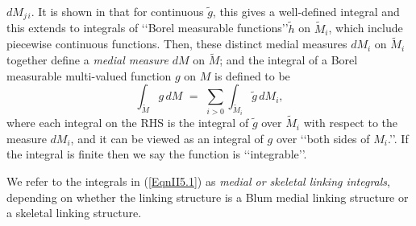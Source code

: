 \documentclass[10pt]{amsart}
\theoremstyle{definition}
\theoremstyle{definition}
\numberwithin{equation}{section}
\begin{document}
$dM_{j\, i}$.  It is shown in \cite{D4} that for continuous $\tilde g$, this 
gives a well-defined integral and this extends to integrals of \lq\lq Borel 
measurable functions\rq\rq  $\tilde h$ on $\tilde M_i$, which include 
piecewise continuous functions.  
Then, these distinct medial measures $dM_i$ on $\tilde M_i$ together 
define a {\it medial measure} $dM$ on $\tilde M$; and the integral of a 
Borel measurable multi-valued function $g$ on $M$
is defined to be
\begin{equation}
\label{EqnII5.1}
 \int_{\tilde M} g \, dM \,\, = \,\, \sum_{i> 0} \int_{\tilde M_i} \tilde{g}\, 
dM_i , 
\end{equation}
where each integral on the RHS is the integral of $\tilde g$ over $\tilde 
M_i$ with respect to the measure $dM_i$, and it can be viewed as an 
integral of $g$ over \lq\lq both sides of $M_i$.\rq\rq.  If the integral is 
finite then we say the function is \lq\lq integrable\rq\rq. \par
We refer to the integrals in (\ref{EqnII5.1}) as {\it medial 
or skeletal linking integrals}, depending on whether the linking structure 
is a Blum medial linking structure or a skeletal linking structure.  \par
\end{document}
